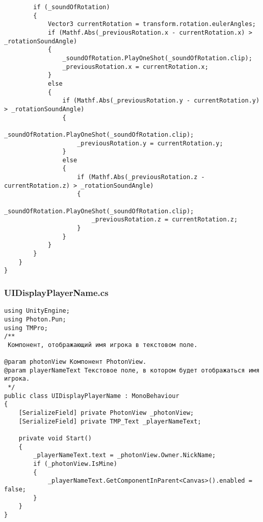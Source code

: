 \begin{verbatim}
        if (_soundOfRotation)
        {
            Vector3 currentRotation = transform.rotation.eulerAngles;
            if (Mathf.Abs(_previousRotation.x - currentRotation.x) > _rotationSoundAngle)
            {
                _soundOfRotation.PlayOneShot(_soundOfRotation.clip);
                _previousRotation.x = currentRotation.x;
            }
            else
            {
                if (Mathf.Abs(_previousRotation.y - currentRotation.y) > _rotationSoundAngle)
                {
                    _soundOfRotation.PlayOneShot(_soundOfRotation.clip);
                    _previousRotation.y = currentRotation.y;
                }
                else
                {
                    if (Mathf.Abs(_previousRotation.z - currentRotation.z) > _rotationSoundAngle)
                    {
                        _soundOfRotation.PlayOneShot(_soundOfRotation.clip);
                        _previousRotation.z = currentRotation.z;
                    }
                }
            }
        }
    }
}

\end{verbatim}
\subsubsection*{UIDisplayPlayerName.cs}
\begin{verbatim}
﻿using UnityEngine;
using Photon.Pun;
using TMPro;
/**
 Компонент, отображающий имя игрока в текстовом поле.

@param photonView Компонент PhotonView.
@param playerNameText Текстовое поле, в котором будет отображаться имя игрока.
 */
public class UIDisplayPlayerName : MonoBehaviour
{
    [SerializeField] private PhotonView _photonView;
    [SerializeField] private TMP_Text _playerNameText;

    private void Start()
    {
        _playerNameText.text = _photonView.Owner.NickName;
        if (_photonView.IsMine)
        {
            _playerNameText.GetComponentInParent<Canvas>().enabled = false;
        }
    }
}

\end{verbatim}
